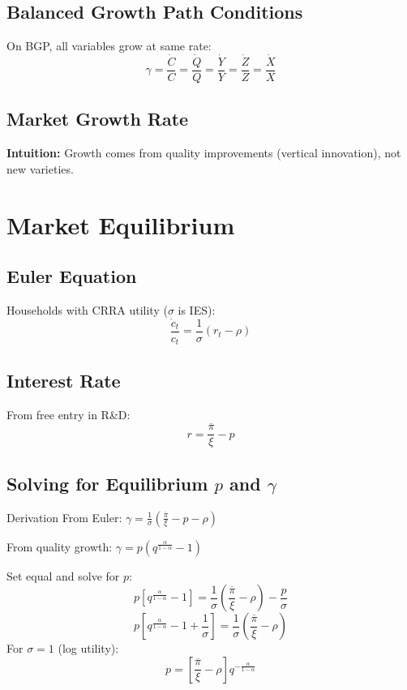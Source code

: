 \documentclass[a4paper,11pt]{article}
\begin{document}
\subsection*{Balanced Growth Path Conditions}
On BGP, all variables grow at same rate:
\[
\gamma = \frac{\dot{C}}{C} = \frac{\dot{Q}}{Q} = \frac{\dot{Y}}{Y} = \frac{\dot{Z}}{Z} = \frac{\dot{X}}{X}
\tag{BGP}
\]

\subsection*{Market Growth Rate}

\medskip
\noindent \textbf{Intuition:} Growth comes from quality improvements (vertical innovation), not new varieties.

\clearpage

\section{Market Equilibrium}

\subsection*{Euler Equation}
Households with CRRA utility ($\sigma$ is IES):
\[
\frac{\dot{c}_t}{c_t} = \frac{1}{\sigma}(r_t - \rho)
\tag{EE}
\]

\subsection*{Interest Rate}
From free entry in R\&D:
\[
r = \frac{\overline{\pi}}{\xi} - p
\tag{Interest Rate}
\]

\subsection*{Solving for Equilibrium $p$ and $\gamma$}
\begin{derivationbox}{Derivation}
From Euler: $\gamma = \frac{1}{\sigma}(\frac{\overline{\pi}}{\xi} - p - \rho)$

From quality growth: $\gamma = p(q^{\frac{\alpha}{1-\alpha}} - 1)$

Set equal and solve for $p$:
\[
p\left[q^{\frac{\alpha}{1-\alpha}} - 1\right] = \frac{1}{\sigma}\left(\frac{\overline{\pi}}{\xi} - \rho\right) - \frac{p}{\sigma}
\]
\[
p\left[q^{\frac{\alpha}{1-\alpha}} - 1 + \frac{1}{\sigma}\right] = \frac{1}{\sigma}\left(\frac{\overline{\pi}}{\xi} - \rho\right)
\]
For $\sigma = 1$ (log utility):
\[
p = \left[\frac{\overline{\pi}}{\xi} - \rho\right] q^{-\frac{\alpha}{1-\alpha}}
\]
\end{derivationbox}
\end{document}
